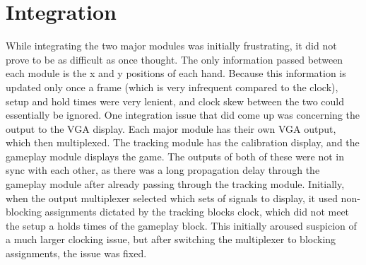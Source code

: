 \section{Integration}
\label{sec:integration}

While integrating the two major modules was initially frustrating, it did not
prove to be as difficult as once thought. The only information passed between
each module is the x and y positions of each hand. Because this information is
updated only once a frame (which is very infrequent compared to the clock),
setup and hold times were very lenient, and clock skew between the two could
essentially be ignored. One integration issue that did come up was concerning
the output to the VGA display. Each major module has their own VGA output, which
then multiplexed. The tracking module has the calibration display, and the
gameplay module displays the game. The outputs of both of these were not in sync
with each other, as there was a long propagation delay through the gameplay
module after already passing through the tracking module. Initially, when the
output multiplexer selected which sets of signals to display, it used
non-blocking assignments dictated by the tracking blocks clock, which did not
meet the setup a holds times of the gameplay block. This initially aroused
suspicion of a much larger clocking issue, but after switching the multiplexer
to blocking assignments, the issue was fixed.
